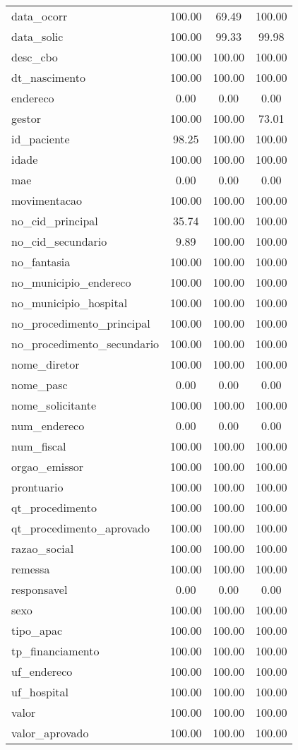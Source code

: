 \documentclass[
  12,
  table]{proadi}
\begin{document}
\begin{longtable}{lccc}
data\_ocorr & 100.00 & 69.49 & 100.00\\
data\_solic & 100.00 & 99.33 & 99.98\\
desc\_cbo & 100.00 & 100.00 & 100.00\\
dt\_nascimento & 100.00 & 100.00 & 100.00\\
\addlinespace
endereco & 0.00 & 0.00 & 0.00\\
gestor & 100.00 & 100.00 & 73.01\\
id\_paciente & 98.25 & 100.00 & 100.00\\
idade & 100.00 & 100.00 & 100.00\\
mae & 0.00 & 0.00 & 0.00\\
\addlinespace
movimentacao & 100.00 & 100.00 & 100.00\\
no\_cid\_principal & 35.74 & 100.00 & 100.00\\
no\_cid\_secundario & 9.89 & 100.00 & 100.00\\
no\_fantasia & 100.00 & 100.00 & 100.00\\
no\_municipio\_endereco & 100.00 & 100.00 & 100.00\\
\addlinespace
no\_municipio\_hospital & 100.00 & 100.00 & 100.00\\
no\_procedimento\_principal & 100.00 & 100.00 & 100.00\\
no\_procedimento\_secundario & 100.00 & 100.00 & 100.00\\
nome\_diretor & 100.00 & 100.00 & 100.00\\
nome\_pasc & 0.00 & 0.00 & 0.00\\
\addlinespace
nome\_solicitante & 100.00 & 100.00 & 100.00\\
num\_endereco & 0.00 & 0.00 & 0.00\\
num\_fiscal & 100.00 & 100.00 & 100.00\\
orgao\_emissor & 100.00 & 100.00 & 100.00\\
prontuario & 100.00 & 100.00 & 100.00\\
\addlinespace
qt\_procedimento & 100.00 & 100.00 & 100.00\\
qt\_procedimento\_aprovado & 100.00 & 100.00 & 100.00\\
razao\_social & 100.00 & 100.00 & 100.00\\
remessa & 100.00 & 100.00 & 100.00\\
responsavel & 0.00 & 0.00 & 0.00\\
\addlinespace
sexo & 100.00 & 100.00 & 100.00\\
tipo\_apac & 100.00 & 100.00 & 100.00\\
tp\_financiamento & 100.00 & 100.00 & 100.00\\
uf\_endereco & 100.00 & 100.00 & 100.00\\
uf\_hospital & 100.00 & 100.00 & 100.00\\
\addlinespace
valor & 100.00 & 100.00 & 100.00\\
valor\_aprovado & 100.00 & 100.00 & 100.00\\*
\end{longtable}
\endgroup{}
\end{document}
